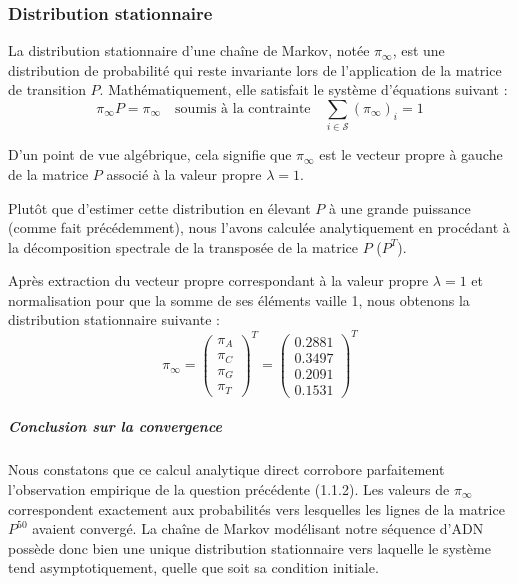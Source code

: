 \subsubsection{Distribution stationnaire}

La distribution stationnaire d'une chaîne de Markov, 
notée $\pi_\infty$, est une distribution de probabilité qui 
reste invariante lors de l'application de la matrice de transition $P$. 
Mathématiquement, elle satisfait le système d'équations suivant :
\begin{equation}
    \pi_\infty P = \pi_\infty \quad \text{soumis à la contrainte} \quad \sum_{i \in \mathcal{S}} (\pi_\infty)_i = 1
\end{equation}

D'un point de vue algébrique, cela signifie que $\pi_\infty$ est le vecteur 
propre à gauche de la matrice $P$ associé à la valeur propre $\lambda = 1$.

Plutôt que d'estimer cette distribution en élevant $P$ à une grande puissance 
(comme fait précédemment), nous l'avons calculée analytiquement en procédant 
à la décomposition spectrale de la transposée de la matrice $P$ ($P^T$).

Après extraction du vecteur propre correspondant à la valeur 
propre $\lambda = 1$ et normalisation pour que la somme de ses éléments vaille 1, 
nous obtenons la distribution stationnaire suivante :
\begin{equation}
    \pi_\infty = 
    \begin{pmatrix}
        \pi_A \\ \pi_C \\ \pi_G \\ \pi_T
    \end{pmatrix}^T
    = 
    \begin{pmatrix}
        0.2881 \\ 0.3497 \\ 0.2091 \\ 0.1531 
    \end{pmatrix}^T
\end{equation}

\subparagraph{Conclusion sur la convergence}
Nous constatons que ce calcul analytique direct corrobore parfaitement 
l'observation empirique de la question précédente (1.1.2). Les valeurs de $\pi_\infty$ 
correspondent exactement aux probabilités vers lesquelles les lignes de la matrice $P^{50}$ 
avaient convergé. La chaîne de Markov modélisant notre séquence d'ADN possède donc 
bien une unique distribution stationnaire vers laquelle le système tend asymptotiquement, 
quelle que soit sa condition initiale.